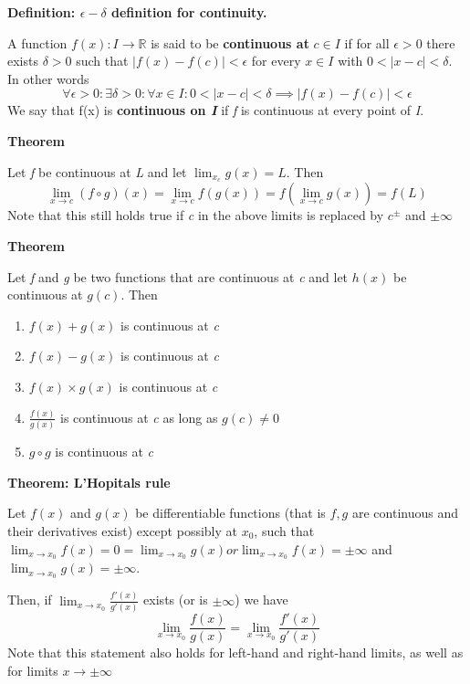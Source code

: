 \documentclass{article}
\newcommand*{\R}{\mathbb{R}}
\begin{document}
\vspace{\baselineskip}
\textbf{Definition: \(\epsilon - \delta\) definition for continuity.}

A function \(f(x): I \to \R\) is said to be \textbf{continuous at} \(c \in I\) if for all \(\epsilon > 0\) there exists \(\delta > 0\) such that \(|f(x) - f(c)| < \epsilon\) for every \(x\in I\) with \(0 < |x - c| < \delta\). In other words
\begin{equation}
    \forall \epsilon > 0: \exists \delta > 0: \forall x \in I: 0 < |x-c| < \delta \implies |f(x) - f(c)| < \epsilon
\end{equation}
We say that f(x) is \textbf{continuous on \textit{I}} if \textit{f} is continuous at every point of \textit{I}.

\vspace{\baselineskip}
\textbf{Theorem}

Let \textit{f} be continuous at \textit{L} and let \(\lim_{x_c}g(x) = L\). Then
\begin{equation}
    \lim_{x\to c}(f \circ g)(x) = \lim_{x \to c}f(g(x)) = f\left(\lim_{x\to c}g(x)\right) = f(L)
\end{equation}
Note that this still holds true if \textit{c} in the above limits is replaced by \(c^{\pm}\) and \(\pm\infty\)

\vspace{\baselineskip}
\textbf{Theorem}

Let \textit{f} and \textit{g} be two functions that are continuous at \textit{c} and let \(h(x)\) be continuous at \(g(c)\). Then
\begin{enumerate}
    \item \(f(x) + g(x)\) is continuous at \textit{c}
    \item \(f(x) - g(x)\) is continuous at \textit{c}
    \item \(f(x)\times g(x)\) is continuous at \textit{c}
    \item \(\frac{f(x)}{g(x)}\) is continuous at \textit{c} as long as \(g(c) \neq 0\)
    \item \(g \circ g\) is continuous at \textit{c}
\end{enumerate}

\vspace{\baselineskip}
\textbf{Theorem: L'Hopitals rule}

Let \(f(x)\) and \(g(x)\) be differentiable functions (that is \(f,g\) are continuous and their derivatives exist) except possibly at \(x_0\), such that \(\lim_{x\to x_0}f(x)=0=\lim_{x\to x_0}g(x) or \lim_{x\to x_0}f(x) = \pm\infty\) and \(\lim_{x\to x_0}g(x) = \pm\infty\). 

Then, if \(\lim_{x\to x_0}\frac{f'(x)}{g'(x)}\) exists (or is \(\pm\infty\)) we have
\begin{equation}
    \lim_{x\to x_0}\frac{f(x)}{g(x)} = \lim_{x\to x_0}\frac{f'(x)}{g'(x)}
\end{equation}
Note that this statement also holds for left-hand and right-hand limits, as well as for limits \(x \to \pm\infty\)
\end{document}
